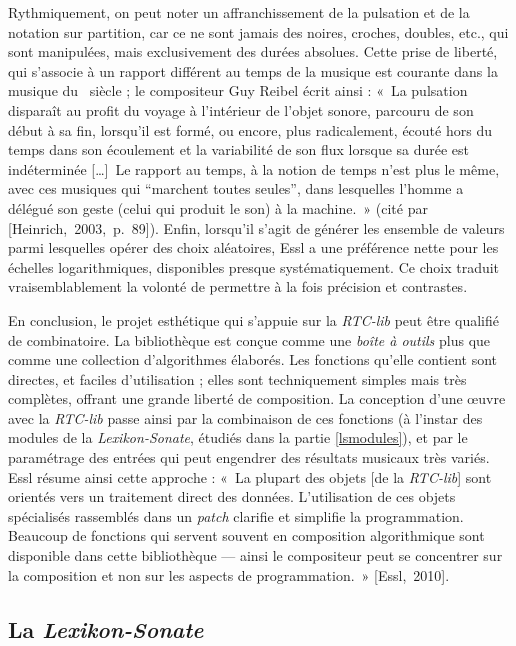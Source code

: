 \documentclass[a4paper,12pt]{article}
\newcommand{\guill}[1]{«~#1~»}
\newcommand{\guilldeux}[1]{“#1”}
\newcommand{\tpp}[0]{[\dots]}
\newcommand{\cicite}[1]{{\footnotesize[#1]}}
\begin{document}
Rythmiquement, on peut noter un affranchissement de la pulsation et de la notation sur partition, car ce ne sont jamais des noires, croches, doubles, etc., qui sont manipulées, mais exclusivement des durées absolues. Cette prise de liberté, qui s'associe à un rapport différent au temps de la musique est courante dans la musique du \XXe~siècle ; le compositeur Guy Reibel écrit ainsi : \guill{La pulsation disparaît au profit du voyage à l'intérieur de l'objet sonore, parcouru de son début à sa fin, lorsqu'il est formé, ou encore, plus radicalement, écouté hors du temps dans son écoulement et la variabilité de son flux lorsque sa durée est indéterminée \tpp~Le rapport au temps, à la notion de temps n'est plus le même, avec ces musiques qui \guilldeux{marchent toutes seules}, dans lesquelles l'homme a délégué son geste (celui qui produit le son) à la machine.} (cité par \cicite{Heinrich,~2003,~p.~89}). Enfin, lorsqu'il s'agit de générer les ensemble de valeurs parmi lesquelles opérer des choix aléatoires, Essl a une préférence nette pour les échelles logarithmiques, disponibles presque systématiquement. Ce choix traduit vraisemblablement la volonté de permettre à la fois précision et contrastes. %

En conclusion, le projet esthétique qui s'appuie sur la \emph{RTC-lib} peut être qualifié de combinatoire. La bibliothèque est conçue comme une \emph{boîte à outils} plus que comme une collection d'algorithmes élaborés. Les fonctions qu'elle contient sont directes, et faciles d'utilisation ; elles sont techniquement simples mais très complètes, offrant une grande liberté de composition. La conception d'une œuvre avec la \emph{RTC-lib} passe ainsi par la combinaison de ces fonctions (à l'instar des modules de la \emph{Lexikon-Sonate}, étudiés dans la partie \ref{lsmodules}), et par le paramétrage des entrées qui peut engendrer des résultats musicaux très variés. Essl résume ainsi cette approche : \guill{La plupart des objets [de la \emph{RTC-lib}] sont orientés vers un traitement direct des données. L'utilisation de ces objets spécialisés rassemblés dans un \emph{patch} clarifie et simplifie la programmation. Beaucoup de fonctions qui servent souvent en composition algorithmique sont disponible dans cette bibliothèque --- ainsi le compositeur peut se concentrer sur la composition et non sur les aspects de programmation.} \cicite{Essl,~2010}.


\subsection{La \emph{Lexikon-Sonate}}
\label{lalexikonsonate}
\end{document}

